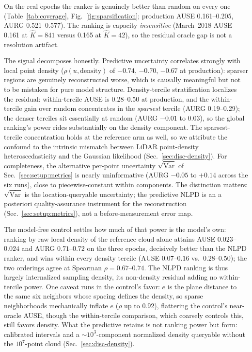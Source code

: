 On the real epochs the ranker is genuinely better than random on
every one (Table~\ref{tab:coverage},
Fig.~\ref{fig:sparsification}; production AUSE 0.161--0.205, AURG
0.521--0.577). The ranking is capacity-\emph{insensitive} (March~2018
AUSE 0.161 at $\hat{K}=841$ versus 0.165 at $\hat{K}=42$), so the
residual oracle gap is not a resolution artifact.

 The signal decomposes honestly. Predictive uncertainty correlates
strongly with local point density ($\rho(u,\mathrm{density})$ of
$-0.74$, $-0.70$, $-0.67$ at production): sparser regions are genuinely
reconstructed worse, which is causally meaningful but not to be mistaken
for pure model structure.
Density-tercile stratification localizes the residual: within-tercile
AUSE is 0.28--0.50 at production, and the within-tercile gain over
random concentrates in the \emph{sparsest} tercile (AURG 0.19--0.29);
the denser terciles sit essentially at random (AURG $-0.01$ to
$0.03$), so the global ranking's power rides substantially on the
density component. The sparsest-tercile concentration holds at the reference arm as
well, so we attribute the confound to the intrinsic mismatch between
LiDAR point-density heteroscedasticity and the Gaussian likelihood
(Sec.~\ref{sec:disc-density}). For completeness, the alternative
per-point uncertainty $\sqrt{\overline{\mathrm{Var}}}$
of Sec.~\ref{sec:setup:metrics}
is nearly uninformative (AURG $-0.05$ to $+0.14$ across the six runs),
close to piecewise-constant within components. The distinction matters:
$\sqrt{\overline{\mathrm{Var}}}$ is the location-queryable uncertainty; the
predictive NLPD is an a posteriori quality-assurance instrument for
the reconstruction (Sec.~\ref{sec:setup:metrics}), not a
before-measurement error map.

 The model-free control settles how much of that power is the model's
own: ranking by raw local density of the reference cloud alone
attains AUSE $0.023$--$0.024$ and AURG $0.71$--$0.72$ on the three
epochs, decisively better than the NLPD ranker, and wins within every
density tercile (AUSE $0.07$--$0.16$ vs.\ $0.28$--$0.50$); the two
orderings agree at Spearman $\rho = 0.67$--$0.74$. The NLPD ranking
is thus largely internalized sampling density, its non-density
residual adding no within-tercile power. One caveat runs in the
control's favor: $e$ is the plane distance to the same six neighbors
whose spacing defines the density, so sparse neighborhoods
mechanically inflate $e$ ($\rho$ up to $0.92$), flattering the
control's near-oracle AUSE, though the within-tercile comparison,
which coarsely controls this, still favors density. What the
predictive retains is not ranking power but form: calibrated
intervals and a ${\sim}10^{3}$-component normalized density queryable
without the $10^{7}$-point cloud (Sec.~\ref{sec:disc-density}).

